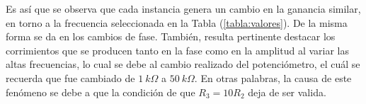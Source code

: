 Es así que se observa que cada instancia genera un cambio en la ganancia similar, en torno a la frecuencia seleccionada en la Tabla (\ref{tabla:valores}). De la misma forma se da en los cambios de fase.
También, resulta pertinente destacar los corrimientos que se producen tanto en la fase como en la amplitud al variar las altas frecuencias, lo cual se debe al cambio realizado del potenciómetro, el cuál se recuerda que fue cambiado de $1 \ k\Omega$ a $50 \ k\Omega$. En otras palabras, la causa de este fenómeno se debe a que la condición de que $R_3 = 10R_2$ deja de ser valida.


